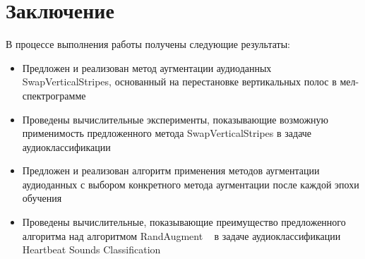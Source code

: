 \documentclass[12pt, fleqn]{article}
\begin{document}
\section{Заключение}

В процессе выполнения работы получены следующие результаты:

\begin{itemize}
    \item Предложен и реализован метод аугментации аудиоданных SwapVerticalStripes, основанный на перестановке вертикальных полос в мел-спектрограмме
    \item Проведены вычислительные эксперименты, показывающие возможную применимость предложенного метода SwapVerticalStripes в задаче аудиоклассификации
    \item Предложен и реализован алгоритм применения методов аугментации аудиоданных с выбором конкретного метода аугментации после каждой эпохи обучения
    \item Проведены вычислительные, показывающие преимущество предложенного алгоритма над алгоритмом RandAugment ~\cite{RandAugment} в задаче аудиоклассификации Heartbeat Sounds Classification ~\cite{HeartbeatSoundsArticle}~\cite{HeartbeatSoundsKaggle}
\end{itemize}
\end{document}
